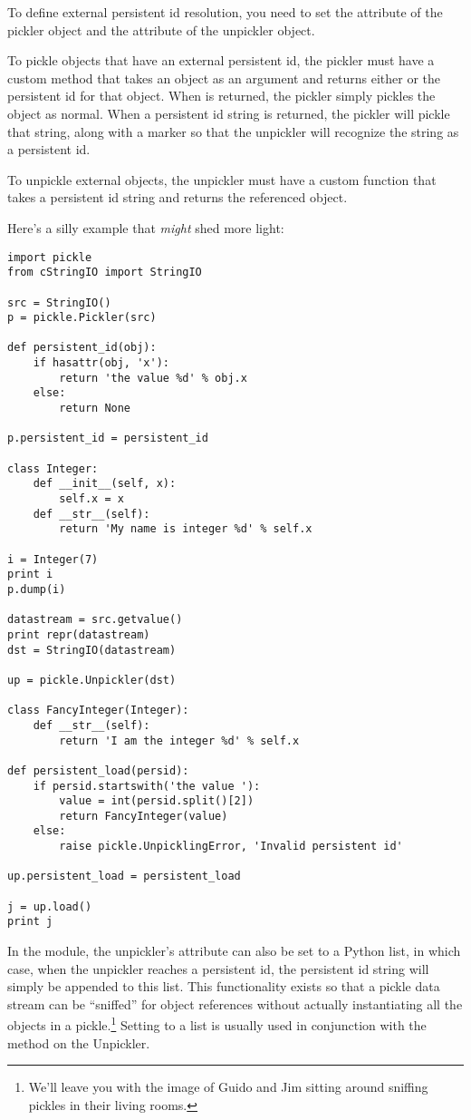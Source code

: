 To define external persistent id resolution, you need to set the
 attribute of the pickler object and the
 attribute of the unpickler object.

To pickle objects that have an external persistent id, the pickler
must have a custom  method that takes an
object as an argument and returns either  or the persistent
id for that object.  When  is returned, the pickler simply
pickles the object as normal.  When a persistent id string is
returned, the pickler will pickle that string, along with a marker
so that the unpickler will recognize the string as a persistent id.

To unpickle external objects, the unpickler must have a custom
 function that takes a persistent id
string and returns the referenced object.

Here's a silly example that \emph{might} shed more light:

\begin{verbatim}
import pickle
from cStringIO import StringIO

src = StringIO()
p = pickle.Pickler(src)

def persistent_id(obj):
    if hasattr(obj, 'x'):
        return 'the value %d' % obj.x
    else:
        return None

p.persistent_id = persistent_id

class Integer:
    def __init__(self, x):
        self.x = x
    def __str__(self):
        return 'My name is integer %d' % self.x

i = Integer(7)
print i
p.dump(i)

datastream = src.getvalue()
print repr(datastream)
dst = StringIO(datastream)

up = pickle.Unpickler(dst)

class FancyInteger(Integer):
    def __str__(self):
        return 'I am the integer %d' % self.x

def persistent_load(persid):
    if persid.startswith('the value '):
        value = int(persid.split()[2])
        return FancyInteger(value)
    else:
        raise pickle.UnpicklingError, 'Invalid persistent id'

up.persistent_load = persistent_load

j = up.load()
print j
\end{verbatim}

In the  module, the unpickler's
 attribute can also be set to a Python
list, in which case, when the unpickler reaches a persistent id, the
persistent id string will simply be appended to this list.  This
functionality exists so that a pickle data stream can be ``sniffed''
for object references without actually instantiating all the objects
in a pickle.\footnote{We'll leave you with the image of Guido and Jim
sitting around sniffing pickles in their living rooms.}  Setting
 to a list is usually used in conjunction with
the  method on the Unpickler.

